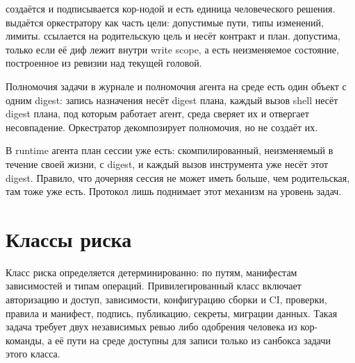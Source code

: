 \begin{center}
\end{center}

 создаётся и подписывается кор-нодой и есть единица человеческого решения.  выдаётся оркестратору как часть цели: допустимые пути, типы изменений, лимиты.  ссылается на родительскую цель и несёт контракт и план.  допустима, только если её диф лежит внутри write scope, а  есть неизменяемое состояние, построенное из ревизии над текущей головой.

Полномочия задачи в журнале и полномочия агента на среде есть один объект с одним digest: запись назначения несёт digest плана, каждый вызов shell несёт digest плана, под которым работает агент, среда сверяет их и отвергает несовпадение. Оркестратор декомпозирует полномочия, но не создаёт их.

\begin{whybox}
В runtime агента план сессии уже есть: скомпилированный, неизменяемый в течение своей жизни, с digest, и каждый вызов инструмента уже несёт этот digest. Правило, что дочерняя сессия не может иметь больше, чем родительская, там тоже уже есть. Протокол лишь поднимает этот механизм на уровень задач.
\end{whybox}

\section{Классы риска}

Класс риска определяется детерминированно: по путям, манифестам зависимостей и типам операций. Привилегированный класс включает авторизацию и доступ, зависимости, конфигурацию сборки и CI, проверки, правила и манифест, подпись, публикацию, секреты, миграции данных. Такая задача требует двух независимых ревью либо одобрения человека из кор-команды, а её пути на среде доступны для записи только из санбокса задачи этого класса.

